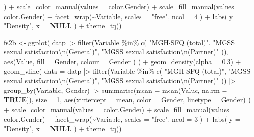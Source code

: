 \documentclass[
  bookmarksnumbered]{article}
\newenvironment{Shaded}{\begin{snugshade}}{\end{snugshade}}
\newcommand{\AttributeTok}[1]{\textcolor[rgb]{0.80,0.80,0.80}{#1}}
\newcommand{\ConstantTok}[1]{\textcolor[rgb]{0.86,0.64,0.64}{\textbf{#1}}}
\newcommand{\DecValTok}[1]{\textcolor[rgb]{0.86,0.86,0.80}{#1}}
\newcommand{\FloatTok}[1]{\textcolor[rgb]{0.75,0.75,0.82}{#1}}
\newcommand{\FunctionTok}[1]{\textcolor[rgb]{0.94,0.94,0.56}{#1}}
\newcommand{\NormalTok}[1]{\textcolor[rgb]{0.80,0.80,0.80}{#1}}
\newcommand{\OtherTok}[1]{\textcolor[rgb]{0.94,0.94,0.56}{#1}}
\newcommand{\SpecialCharTok}[1]{\textcolor[rgb]{0.86,0.64,0.64}{#1}}
\newcommand{\StringTok}[1]{\textcolor[rgb]{0.80,0.58,0.58}{#1}}
\begin{document}
\begin{Shaded}
\begin{Highlighting}[]
\NormalTok{  ) }\SpecialCharTok{+}
  \FunctionTok{scale\_color\_manual}\NormalTok{(}\AttributeTok{values =}\NormalTok{ color.Gender) }\SpecialCharTok{+}
  \FunctionTok{scale\_fill\_manual}\NormalTok{(}\AttributeTok{values =}\NormalTok{ color.Gender) }\SpecialCharTok{+}
  \FunctionTok{facet\_wrap}\NormalTok{(}\SpecialCharTok{\textasciitilde{}}\NormalTok{Variable,}
    \AttributeTok{scales =} \StringTok{"free"}\NormalTok{,}
    \AttributeTok{ncol =} \DecValTok{4}
\NormalTok{  ) }\SpecialCharTok{+}
  \FunctionTok{labs}\NormalTok{(}
    \AttributeTok{y =} \StringTok{"Density"}\NormalTok{,}
    \AttributeTok{x =} \ConstantTok{NULL}
\NormalTok{  ) }\SpecialCharTok{+}
  \FunctionTok{theme\_tq}\NormalTok{()}

\NormalTok{fs2b }\OtherTok{\textless{}{-}} \FunctionTok{ggplot}\NormalTok{(}
\NormalTok{  datp }\SpecialCharTok{|\textgreater{}}
    \FunctionTok{filter}\NormalTok{(Variable }\SpecialCharTok{\%in\%} \FunctionTok{c}\NormalTok{(}
      \StringTok{"MGH{-}SFQ (total)"}\NormalTok{,}
      \StringTok{"MGSS sexual satisfaction}\SpecialCharTok{\textbackslash{}n}\StringTok{(General)"}\NormalTok{,}
      \StringTok{"MGSS sexual satisfaction}\SpecialCharTok{\textbackslash{}n}\StringTok{(Partner)"}
\NormalTok{    )),}
  \FunctionTok{aes}\NormalTok{(Value,}
    \AttributeTok{fill =}\NormalTok{ Gender,}
    \AttributeTok{colour =}\NormalTok{ Gender}
\NormalTok{  )}
\NormalTok{) }\SpecialCharTok{+}
  \FunctionTok{geom\_density}\NormalTok{(}\AttributeTok{alpha =} \FloatTok{0.3}\NormalTok{) }\SpecialCharTok{+}
  \FunctionTok{geom\_vline}\NormalTok{(}
    \AttributeTok{data =}\NormalTok{ datp }\SpecialCharTok{|\textgreater{}}
      \FunctionTok{filter}\NormalTok{(Variable }\SpecialCharTok{\%in\%} \FunctionTok{c}\NormalTok{(}
        \StringTok{"MGH{-}SFQ (total)"}\NormalTok{,}
        \StringTok{"MGSS sexual satisfaction}\SpecialCharTok{\textbackslash{}n}\StringTok{(General)"}\NormalTok{,}
        \StringTok{"MGSS sexual satisfaction}\SpecialCharTok{\textbackslash{}n}\StringTok{(Partner)"}
\NormalTok{      )) }\SpecialCharTok{|\textgreater{}}
      \FunctionTok{group\_by}\NormalTok{(Variable, Gender) }\SpecialCharTok{|\textgreater{}}
      \FunctionTok{summarise}\NormalTok{(}\AttributeTok{mean =} \FunctionTok{mean}\NormalTok{(Value, }\AttributeTok{na.rm =} \ConstantTok{TRUE}\NormalTok{)),}
    \AttributeTok{size =} \DecValTok{1}\NormalTok{,}
    \FunctionTok{aes}\NormalTok{(}\AttributeTok{xintercept =}\NormalTok{ mean, }\AttributeTok{color =}\NormalTok{ Gender, }\AttributeTok{linetype =}\NormalTok{ Gender)}
\NormalTok{  ) }\SpecialCharTok{+}
  \FunctionTok{scale\_color\_manual}\NormalTok{(}\AttributeTok{values =}\NormalTok{ color.Gender) }\SpecialCharTok{+}
  \FunctionTok{scale\_fill\_manual}\NormalTok{(}\AttributeTok{values =}\NormalTok{ color.Gender) }\SpecialCharTok{+}
  \FunctionTok{facet\_wrap}\NormalTok{(}\SpecialCharTok{\textasciitilde{}}\NormalTok{Variable,}
    \AttributeTok{scales =} \StringTok{"free"}\NormalTok{,}
    \AttributeTok{ncol =} \DecValTok{3}
\NormalTok{  ) }\SpecialCharTok{+}
  \FunctionTok{labs}\NormalTok{(}
    \AttributeTok{y =} \StringTok{"Density"}\NormalTok{,}
    \AttributeTok{x =} \ConstantTok{NULL}
\NormalTok{  ) }\SpecialCharTok{+}
  \FunctionTok{theme\_tq}\NormalTok{()}


\end{Highlighting}
\end{Shaded}
\end{document}
